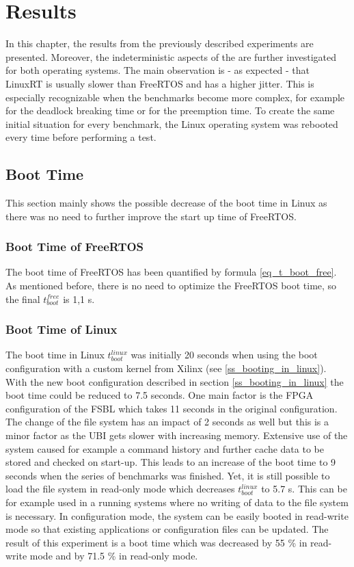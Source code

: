 \chapter{Results}\label{ch_results}
In this chapter, the results from the previously described experiments are presented.
Moreover, the indeterministic aspects of the are further investigated for both operating systems. 
The main observation is - as expected - that LinuxRT is usually slower than FreeRTOS and has a higher jitter. 
This is especially recognizable when the benchmarks become more complex, for example for the deadlock breaking time or for the preemption time.
To create the same initial situation for every benchmark, the Linux operating system was rebooted every time before performing a test.

\section{Boot Time}
This section mainly shows the possible decrease of the boot time in Linux as there was no need to further improve the start up time of FreeRTOS.

\subsection{Boot Time of FreeRTOS}
The boot time of FreeRTOS has been quantified by formula \ref{eq_t_boot_free}.
As mentioned before, there is no need to optimize the FreeRTOS boot time, so the final $ t_{boot}^{free} $ is 1,1 s.

\subsection{Boot Time of Linux}
The boot time in Linux $ t_{boot}^{linux} $ was initially 20 seconds when using the boot configuration with a custom kernel from Xilinx (see \ref{ss_booting_in_linux}). 
With the new boot configuration described in section \ref{ss_booting_in_linux} the boot time could be reduced to 7.5 seconds. 
One main factor is the \ac{FPGA} configuration of the \ac{FSBL} which takes 11 seconds in the original configuration.
The change of the file system has an impact of 2 seconds as well but this is a minor factor as the \ac{UBI} gets slower with increasing memory. 
Extensive use of the system caused for example a command history and further cache data to be stored and checked on start-up.
This leads to an increase of the boot time to 9 seconds when the series of benchmarks was finished.
Yet, it is still possible to load the file system in read-only mode which decreases $ t_{boot}^{linux} $ to 5.7 s.
This can be for example used in a running systems where no writing of data to the file system is necessary.
In configuration mode, the system can be easily booted in read-write mode so that existing applications or configuration files can be updated. 
The result of this experiment is a boot time which was decreased by 55 \% in read-write mode and by 71.5 \% in read-only mode.

